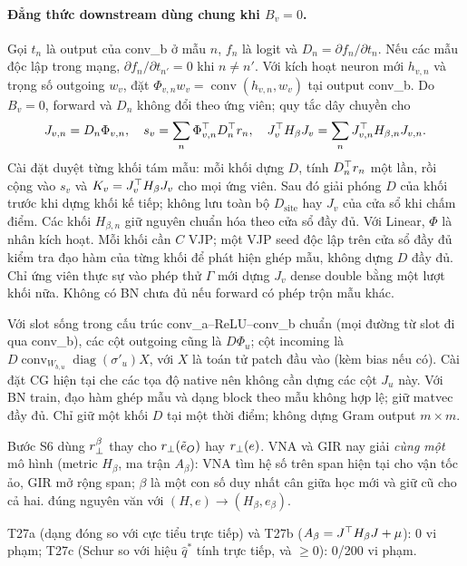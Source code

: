 \paragraph{Đẳng thức downstream dùng chung khi $B_v=0$.}
Gọi $t_n$ là output của conv\_b ở mẫu $n$, $f_n$ là logit và
$D_n=\partial f_n/\partial t_n$. Nếu các mẫu độc lập trong mạng,
$\partial f_n/\partial t_{n'}=0$ khi $n\ne n'$.
Với kích hoạt neuron mới $h_{v,n}$ và trọng số outgoing $w_v$,
đặt $\Phi_{v,n}w_v=\operatorname{conv}(h_{v,n},w_v)$ tại output conv\_b.
Do $B_v=0$, forward và $D_n$ không đổi theo ứng viên; quy tắc dây chuyền cho
\[
 J_{v,n}=D_n\Phi_{v,n},\quad
 s_v=\sum_n\Phi_{v,n}^{\top} D_n^{\top} r_n,\quad
 J_v^{\top} H_\beta J_v=\sum_n J_{v,n}^{\top} H_{\beta,n}J_{v,n}.
\]
Cài đặt duyệt từng khối tám mẫu: mỗi khối dựng $D$, tính $D_n^{\top} r_n$
một lần, rồi cộng vào $s_v$ và $K_v=J_v^{\top} H_\beta J_v$ cho mọi ứng viên.
Sau đó giải phóng $D$ của khối trước khi dựng khối kế tiếp; không lưu toàn bộ
$D_{\mathrm{site}}$ hay $J_v$ của cửa sổ khi chấm điểm. Các khối $H_{\beta,n}$
giữ nguyên chuẩn hóa theo cửa sổ đầy đủ. Với Linear, $\Phi$ là nhân kích hoạt.
Mỗi khối cần $C$ VJP; một VJP seed độc lập trên cửa sổ đầy đủ kiểm tra đạo hàm
của từng khối để phát hiện ghép mẫu, không dựng $D$ đầy đủ. Chỉ ứng viên thực
sự vào phép thử $\Gamma$ mới dựng $J_v$ dense double bằng một lượt khối nữa.
Không có BN chưa đủ nếu forward có phép trộn mẫu khác.

Với slot sống trong cấu trúc conv\_a--ReLU--conv\_b chuẩn (mọi đường từ slot
đi qua conv\_b), các cột outgoing cũng là $D\Phi_u$; cột incoming là
$D\operatorname{conv}_{W_{b,u}}\operatorname{diag}(\sigma'_u)X$,
với $X$ là toán tử patch đầu vào (kèm bias nếu có).
Cài đặt CG hiện tại che các tọa độ native nên không cần dựng các cột $J_u$ này.
Với BN train, đạo hàm ghép mẫu và dạng block theo mẫu không hợp lệ; giữ matvec
đầy đủ. Chỉ giữ một khối $D$ tại một thời điểm; không dựng Gram output $m\times m$.

\begin{hequa}
Bước S6 dùng $r_{\perp}^\beta$ thay cho $r_{\perp}(\tilde e_O)$ hay $r_{\perp}(e)$. VNA và GIR nay giải \emph{cùng một} mô hình (metric $H_\beta$, ma trận $A_\beta$): VNA tìm hệ số trên span hiện tại cho vận tốc ảo, GIR mở rộng span; $\beta$ là một con số duy nhất cân giữa học mới và giữ cũ cho cả hai.  đúng nguyên văn với $(H,e)\to(H_\beta,e_\beta)$.
\end{hequa}
\begin{kiem}
T27a (dạng đóng so với cực tiểu trực tiếp) và T27b ($A_\beta=J^{\top} H_\beta J+\mu$): 0 vi phạm; T27c (Schur so với hiệu $\hat q^*$ tính trực tiếp, và $\ge0$): 0/200 vi phạm.
\end{kiem}

